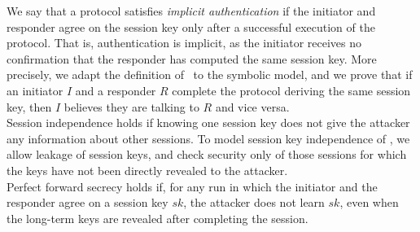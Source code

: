 %
We say that a protocol satisfies \emph{implicit authentication} if the
initiator and responder agree on the session key only after a successful
execution of the protocol.
%
That is, authentication is implicit, as the
initiator receives no confirmation that the responder has computed the same session key.
%
More precisely, we adapt the definition of~\cite{DBLP:journals/iacr/GuilhemFW19}
to the symbolic model, and we prove that if an initiator $I$ and a responder $R$
complete the protocol deriving the same session key, then $I$ believes they are
talking to $R$ and vice versa.\\

Session independence holds if knowing one session key does
not give the attacker any information about other sessions.  To model session
key independence of \mEdhoc, we allow leakage of session keys, and 
check security only of those sessions for which the keys have not been
directly revealed to the attacker.\\

Perfect forward
secrecy holds if, for any run in which the initiator and the responder
agree on a session key $sk$, the attacker does not learn $sk$, even when the
long-term keys are revealed after completing the session.

 
%
% 

